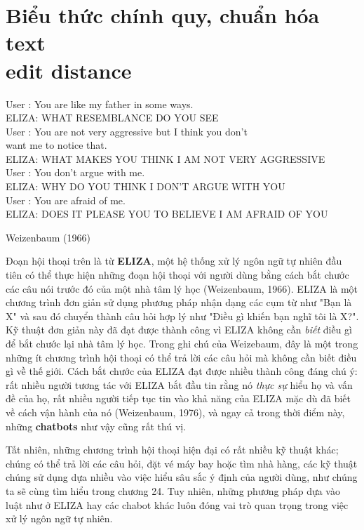 \setcounter{chapter}{1}

\chapter{Biểu thức chính quy, chuẩn hóa text\\edit distance}
\setlength\epigraphwidth{\textwidth}
\epigraphfontsize{\small}
\epigraph{
{\selectfont
User : You are like my father in some ways. \\
ELIZA: WHAT RESEMBLANCE DO YOU SEE \\
User : You are not very aggressive but I think you don’t \\
\hspace{38pt} want me to notice that. \\
ELIZA: WHAT MAKES YOU THINK I AM NOT VERY AGGRESSIVE \\
User : You don’t argue with me. \\
ELIZA: WHY DO YOU THINK I DON’T ARGUE WITH YOU \\
User : You are afraid of me. \\
ELIZA: DOES IT PLEASE YOU TO BELIEVE I AM AFRAID OF YOU\\
}
}{Weizenbaum (1966)}

Đoạn hội thoại trên là từ \textbf{ELIZA}, một hệ thống xử lý ngôn ngữ tự nhiên đầu tiên có thể thực hiện những đoạn hội thoại với người dùng bằng cách bắt chước các câu nói trước đó của một nhà tâm lý học (Weizenbaum, 1966). ELIZA là một chương trình đơn giản sử dụng phương pháp nhận dạng các cụm từ như "Bạn là X" và sau đó chuyển thành câu hỏi hợp lý như "Điều gì khiến bạn nghĩ tôi là X?". Kỹ thuật đơn giản này đã đạt được thành công vì ELIZA không cần \textit{biết} điều gì để bắt chước lại nhà tâm lý học. Trong ghi chú của Weizebaum, đây là một trong những ít chương trình hội thoại có thể trả lời các câu hỏi mà không cần biết điều gì về thế giới. Cách bắt chước của ELIZA đạt được nhiều thành công đáng chú ý: rất nhiều người tương tác với ELIZA bắt đầu tin rằng nó \textit{thực sự} hiểu họ và vấn đề của họ, rất nhiều người tiếp tục tin vào khả năng của ELIZA mặc dù đã biết về cách vận hành của nó (Weizenbaum, 1976), và ngay cả trong thời điểm này, những \textbf{chatbots} như vậy cũng rất thú vị.

Tất nhiên, những chương trình hội thoại hiện đại có rất nhiều kỹ thuật khác; chúng có thể trả lời các câu hỏi, đặt vé máy bay hoặc tìm nhà hàng, các kỹ thuật chúng sử dụng dựa nhiều vào việc hiểu sâu sắc ý định của người dùng, như chúng ta sẽ cùng tìm hiểu trong chương 24. Tuy nhiên, những phương pháp dựa vào luật như ở ELIZA hay các chabot khác luôn đóng vai trò quan trọng trong việc xử lý ngôn ngữ tự nhiên.

